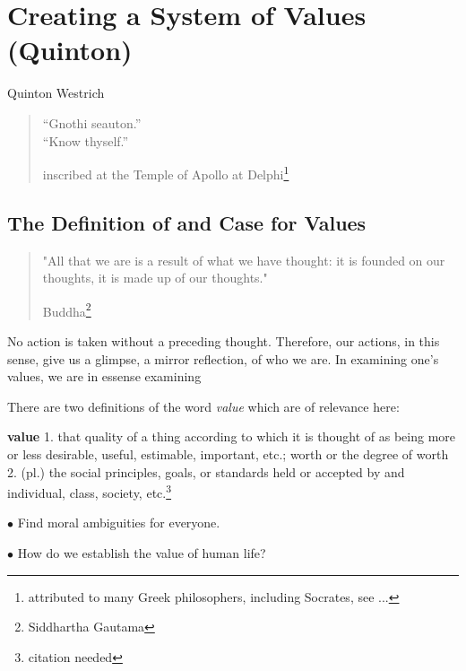 \chapter{Creating a System of Values (Quinton)}

\begin{authors}
	Quinton Westrich
\end{authors}

\begin{quote}
	``Gnothi seauton.'' \\
	``Know thyself.''
	\begin{flushright}
		inscribed at the Temple of Apollo at Delphi\footnote{attributed to many Greek philosophers, including Socrates, see ...}
	\end{flushright}
\end{quote}

\section{The Definition of and Case for Values}

\begin{quote}
	"All that we are is a result of what we have thought: it is founded on our thoughts, it is made up of our thoughts."
	\begin{flushright}
		Buddha\footnote{Siddhartha Gautama}
	\end{flushright}
\end{quote}

No action is taken without a preceding thought. Therefore, our actions, in this sense, give us a glimpse, a mirror reflection, of who we are. In examining one's values, we are in essense examining 

There are two definitions of the word \emph{value} which are of relevance here:

\textbf {value} 
1. that quality of a thing according to which it is thought of as being more or less desirable, useful, estimable, important, etc.; worth or the degree of worth 
2. (pl.) the social principles, goals, or standards held or accepted by and individual, class, society, etc.\footnote{citation needed}


$\bullet$ Find moral ambiguities for everyone.

$\bullet$ How do we establish the value of human life?

